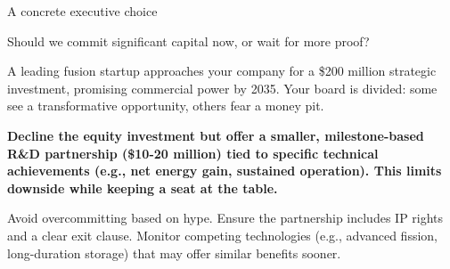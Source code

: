 \documentclass[10pt,a4paper]{article}
\begin{document}
\clearpage
{\sffamily\fontsize{22}{27}\selectfont\color{BONavy} A concrete executive choice}\par\vspace{10pt}
\begin{minipage}[t]{0.43\linewidth}
{\sffamily\fontsize{17}{22}\selectfont\color{BOGreen} Should we commit significant capital now, or wait for more proof?}\par
\end{minipage}\hfill\begin{minipage}[t]{0.50\linewidth}
{\small A leading fusion startup approaches your company for a \$200 million strategic investment, promising commercial power by 2035. Your board is divided: some see a transformative opportunity, others fear a money pit.}\par
{\small\bfseries\color{BOText} Decline the equity investment but offer a smaller, milestone-based R\&D partnership (\$10-20 million) tied to specific technical achievements (e.g., net energy gain, sustained operation). This limits downside while keeping a seat at the table.}\par\vspace{5pt}
{\footnotesize\color{BOMuted} Avoid overcommitting based on hype. Ensure the partnership includes IP rights and a clear exit clause. Monitor competing technologies (e.g., advanced fission, long-duration storage) that may offer similar benefits sooner.}\par\end{minipage}
\end{document}

